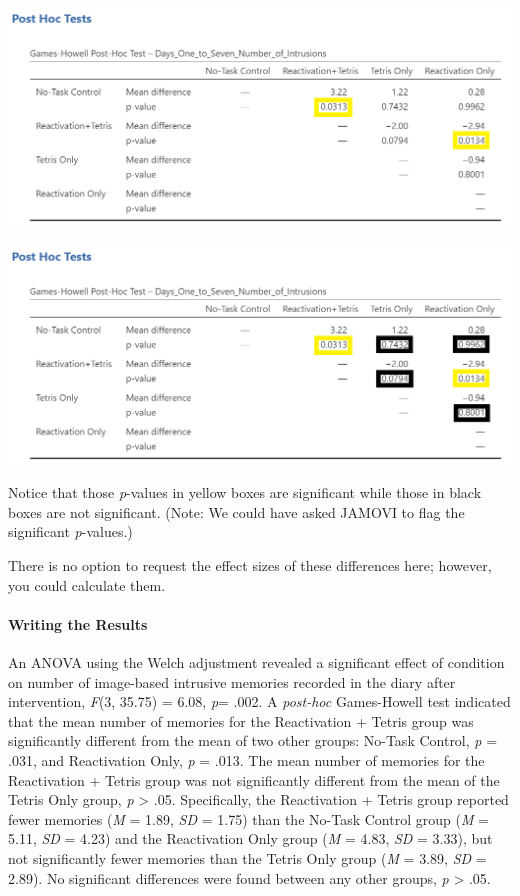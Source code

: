 \documentclass[
]{book}
\begin{document}
\includegraphics{img/GamesHowellPostHocTest_2SigPValues.png}

\includegraphics{img/GamesHowellPostHocTest_SigAndNonSigPValues.png}

Notice that those \emph{p}-values in yellow boxes are significant while those in black boxes are not significant. (Note: We could have asked JAMOVI to flag the significant \emph{p}-values.)

There is no option to request the effect sizes of these differences here; however, you could calculate them.

\hypertarget{writing-the-results}{%
\paragraph{Writing the Results}\label{writing-the-results}}

An ANOVA using the Welch adjustment revealed a significant effect of condition on number of image-based intrusive memories recorded in the diary after intervention, \emph{F}(3, 35.75) = 6.08, \emph{p}= .002. A \emph{post-hoc} Games-Howell test indicated that the mean number of memories for the Reactivation + Tetris group was significantly different from the mean of two other groups: No-Task Control, \emph{p} = .031, and Reactivation Only, \emph{p} = .013. The mean number of memories for the Reactivation + Tetris group was not significantly different from the mean of the Tetris Only group, \emph{p} \textgreater{} .05. Specifically, the Reactivation + Tetris group reported fewer memories (\emph{M} = 1.89, \emph{SD} = 1.75) than the No-Task Control group (\emph{M} = 5.11, \emph{SD} = 4.23) and the Reactivation Only group (\emph{M} = 4.83, \emph{SD} = 3.33), but not significantly fewer memories than the Tetris Only group (\emph{M} = 3.89, \emph{SD} = 2.89). No significant differences were found between any other groups, \emph{p} \textgreater{} .05.
\end{document}
